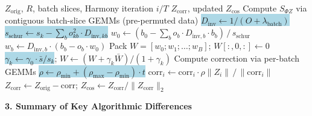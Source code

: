 \documentclass[8pt]{article}
\begin{document}
\begin{tcolorbox}[
    title={\textbf{Algorithm 2c:} harmony\_best\_mixing --- Schur Complement Solve + Per-cell Trust Region},
    colback=lightblue!20, colframe=keychange!80, fonttitle=\small\bfseries,
    boxrule=0.5pt, arc=2pt, left=4pt, right=4pt, top=2pt, bottom=2pt
]
\begin{algorithmic}[1]
\small
\Require $Z_{\text{orig}}$, $R$, batch slices, Harmony iteration $i/T$
\Ensure $Z_{\text{corr}}$, updated $Z_{\text{cos}}$
\State Compute $S_{\Phi Z}$ via contiguous batch-slice GEMMs (pre-permuted data)
\State \colorbox{lightblue}{$D_{\text{inv}} \gets 1 / (O + \lambda_{\text{batch}})$} 
\State \colorbox{lightblue}{$s_{\text{schur}} \gets s_k - \sum_b o_{kb}^2 \cdot D_{\text{inv},kb}$} \Comment{\textcolor{keychange}{Schur complement (no inverse/Cholesky)}}
\State $w_0 \gets (b_0 - \sum_b o_b \cdot D_{\text{inv},b} \cdot b_b) \,/\, s_{\text{schur}}$
\State $w_b \gets D_{\text{inv},b} \cdot (b_b - o_b \cdot w_0)$
\State Pack $W = [w_0; w_1; \ldots; w_B]$; \quad $W[:,0,:] \gets 0$
\State \colorbox{lightblue}{$\gamma_k \gets \gamma_0 \cdot \bar{s} / s_k$}; \quad $W \gets (W + \gamma_k \bar{W}) / (1 + \gamma_k)$ \Comment{\textcolor{keychange}{Cluster-size-adaptive shrinkage}}
\State Compute correction via per-batch GEMMs
\State \colorbox{lightblue}{$\rho \gets \rho_{\min} + (\rho_{\max} - \rho_{\min}) \cdot t$} \Comment{\textcolor{keychange}{Annealed trust radius}}
     \Comment{\textcolor{keychange}{Per-cell magnitude constraint}}
        \State $\text{corr}_i \gets \text{corr}_i \cdot \rho \|Z_i\| \,/\, \|\text{corr}_i\|$ 
    \EndIf
\EndFor
\State $Z_{\text{corr}} \gets Z_{\text{orig}} - \text{corr}$; \quad $Z_{\text{cos}} \gets Z_{\text{corr}} / \|Z_{\text{corr}}\|_2$
\end{algorithmic}
\end{tcolorbox}

\newpage


{\large\bfseries 3. Summary of Key Algorithmic Differences}

\vspace{3pt}
\end{document}
